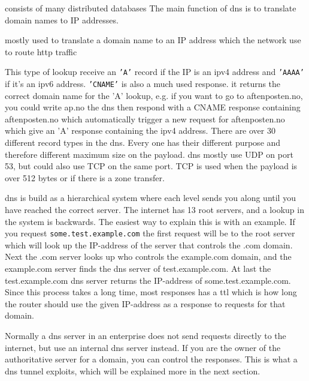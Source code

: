 consists of many distributed databases 
The main function of \Gls{dns} is to translate domain names to IP addresses. 

 mostly used to translate a domain name to an IP address which the network use to route http traffic


This type of lookup receive an \texttt{'A'} record if the IP is an ipv4 address and \texttt{'AAAA'} if it's an ipv6 address. \texttt{'CNAME'} is also a much used response. it returns the correct domain name for the 'A' lookup, e.g. if you want to go to aftenposten.no, you could write ap.no the \Gls{dns} then respond with a CNAME response containing aftenposten.no which automatically trigger a new request for aftenposten.no which give an 'A' response containing the ipv4 address. There are over 30 different record types in the \Gls{dns}. Every one has their different purpose and therefore different maximum size on the payload. \Gls{dns} mostly use UDP on port 53, but could also use TCP on the same port. TCP is used when the payload is over 512 bytes or if there is a zone transfer. 

\Gls{dns} is build as a hierarchical system where each level sends you along until you have reached the correct server. The internet has 13 root servers, and a lookup in the system is backwards. The easiest way to explain this is with an example. If you request \texttt{some.test.example.com} the first request will be to the root server which will look up the IP-address of the server that controls the .com domain. Next the .com server looks up who controls the example.com domain, and the example.com server finds the \Gls{dns} server of test.example.com. At last the test.example.com \Gls{dns} server returns the IP-address of some.test.example.com. Since this process takes a long time, most responses has a \Gls{ttl} which is how long the router should use the given IP-address as a response to requests for that domain.

Normally a \Gls{dns} server in an enterprise does not send requests directly to the internet, but use an internal \Gls{dns} server instead. If you are the owner of the authoritative server for a domain, you can control the responses. This is what a \Gls{dns} tunnel exploits, which will be explained more in the next section. 





 